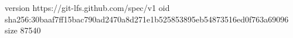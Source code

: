 version https://git-lfs.github.com/spec/v1
oid sha256:30baaf7ff15bac790ad2470a8d271e1b525853895eb54873516ed0f763a69096
size 87540
